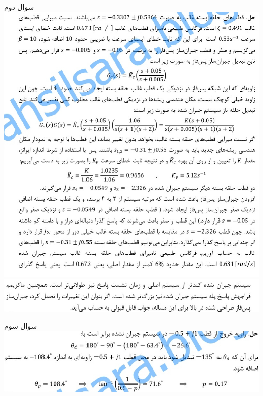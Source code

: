 \documentclass{article}
\begin{document}
    \begin{problem}{سوال دوم}
    	\includegraphics[width=\linewidth]{Resources/2.png}
    	\includegraphics[width=\linewidth]{Resources/2-2.png}
    	
    \end{problem}
    
    \begin{problem}{سوال سوم}
    	\includegraphics[width=\linewidth]{Resources/3.png}
    
    \end{problem}
    
\end{document}
